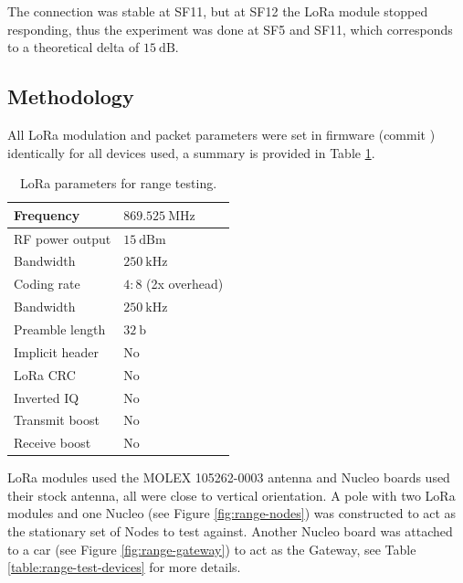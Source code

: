 The connection was stable at SF11, but at SF12 the LoRa module stopped responding, thus the experiment was done at SF5 and SF11, which corresponds to a theoretical delta of $15~\mathrm{dB}$.

\subsection{Methodology}
All LoRa modulation and packet parameters were set in firmware (commit ) identically for all devices used, a summary is provided in Table \ref{table:range-test-parameters}. 

\begin{table}[H]
\begin{center}
\caption{\label{table:range-test-parameters}LoRa parameters for range testing.}
    \begin{tabular}{|l|l|} \hline
    Frequency             & $869.525~\mathrm{MHz}$\\ \hline
    RF power output       & $15~\mathrm{dBm}$\\ \hline
    Bandwidth             & $250~\mathrm{kHz}$\\ \hline
    Coding rate           & $4:8$ (2x overhead) \\ \hline
    Bandwidth             & $250~\mathrm{kHz}$\\ \hline
    Preamble length       & $32~\mathrm{b}$\\ \hline
    Implicit header       & No\\ \hline
    LoRa CRC              & No\\ \hline
    Inverted IQ           & No\\ \hline
    Transmit boost        & No\\ \hline
    Receive boost         & No\\ \hline
    \end{tabular}
\end{center}
\end{table}

LoRa modules used the MOLEX 105262-0003 antenna and Nucleo boards used their stock antenna, all were close to vertical orientation. A pole with two LoRa modules and one Nucleo (see Figure \ref{fig:range-nodes}) was constructed to act as the stationary set of Nodes to test against. Another Nucleo board was attached to a car (see Figure \ref{fig:range-gateway}) to act as the Gateway, see Table \ref{table:range-test-devices} for more details.

